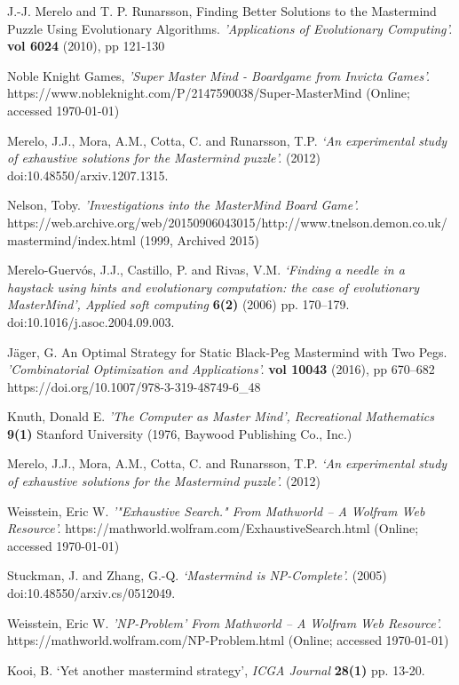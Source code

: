 \documentclass[11pt]{article}  %
\theoremstyle{definition}
\theoremstyle{remark}
\begin{document}
\begin{thebibliography}{99}
J.-J. Merelo and T. P. Runarsson,
Finding Better Solutions to the Mastermind Puzzle Using Evolutionary Algorithms.
{\em 'Applications of Evolutionary Computing'.}
{\bf vol 6024}
(2010), pp 121-130

Noble Knight Games,
{\em 'Super Master Mind - Boardgame from Invicta Games'.}
https://www.nobleknight.com/P/2147590038/Super-MasterMind
(Online; accessed \today)

Merelo, J.J., Mora, A.M., Cotta, C. and Runarsson, T.P. 
{\em  ‘An experimental study of exhaustive solutions for the Mastermind puzzle'.}
(2012)
 doi:10.48550/arxiv.1207.1315.

Nelson, Toby.
{\em 'Investigations into the MasterMind Board Game'.}
https://web.archive.org/web/20150906043015/http://www.tnelson.demon.co.uk/mastermind/index.html
(1999, Archived 2015)

Merelo-Guervós, J.J., Castillo, P. and Rivas, V.M. 
{\em ‘Finding a needle in a haystack using hints and evolutionary computation: the case of evolutionary MasterMind’, Applied soft computing}
{\bf  6(2)}
(2006) pp. 170–179. 
doi:10.1016/j.asoc.2004.09.003.

Jäger, G.
An Optimal Strategy for Static Black-Peg Mastermind with Two Pegs.
{\em 'Combinatorial Optimization and Applications'.}
{\bf vol 10043}
(2016), pp 670–682
https://doi.org/10.1007/978-3-319-48749-6\_48

Knuth, Donald E. 
{\em 'The Computer as Master Mind', Recreational Mathematics}
{\bf 9(1)}
Stanford University
(1976, Baywood Publishing Co., Inc.)

 Merelo, J.J., Mora, A.M., Cotta, C. and Runarsson, T.P. 
{\em ‘An experimental study of exhaustive solutions for the Mastermind puzzle’.}
(2012) 

Weisstein, Eric W.
{\em '"Exhaustive Search." From Mathworld -- A Wolfram Web Resource'.}
https://mathworld.wolfram.com/ExhaustiveSearch.html
(Online; accessed \today)

Stuckman, J. and Zhang, G.-Q.
{\em  ‘Mastermind is NP-Complete’.}
(2005)
doi:10.48550/arxiv.cs/0512049.

Weisstein, Eric W.
{\em 'NP-Problem' From Mathworld -- A Wolfram Web Resource'.}
https://mathworld.wolfram.com/NP-Problem.html
(Online; accessed \today)

Kooi, B.
‘Yet another mastermind strategy’,
{\em ICGA Journal}
{\bf 28(1)}
pp. 13-20.


\end{thebibliography}
\end{document}
